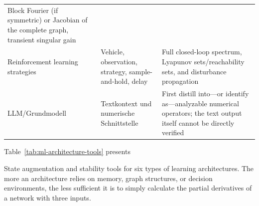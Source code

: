 \documentclass[11pt,a4paper,openany]{book}
\numberwithin{equation}{chapter}
\numberwithin{figure}{chapter}
\numberwithin{table}{chapter}
\newcommand{\tabletext}[2]{%
  \par\smallskip\noindent
  Table~\ref{#1} presents #2
\par\smallskip
}
\begin{document}
\begin{center}
\begin{tabular}{p{3.0cm}p{4.4cm}p{6.7cm}}
Block Fourier (if symmetric) or Jacobian of the complete graph, transient singular gain






\\









Reinforcement learning strategies






&






Vehicle, observation, strategy, sample-and-hold, delay

&

Full closed-loop spectrum, Lyapunov sets/reachability sets, and disturbance propagation





\\







LLM/Grundmodell




&




Textkontext und numerische Schnittstelle




&






First distill into—or identify as—analyzable numerical operators; the text output itself cannot be directly verified





\\
\bottomrule
\end{tabular}
\end{center}
\tabletext{tab:ml-architecture-tools}{






State augmentation and stability tools for six types of learning architectures. The more an architecture relies on memory, graph structures, or decision environments, the less sufficient it is to simply calculate the partial derivatives of a network with three inputs.


}
\end{document}
